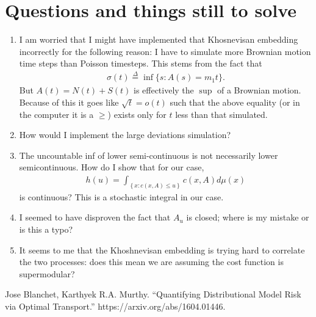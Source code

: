 \documentclass[12pt]{article}
\newcommand{\define}{\overset{\Delta}{=}}
\theoremstyle{definition}
\theoremstyle{definition}
\theoremstyle{definition}
\begin{document}
\section*{Questions and things still to solve}
\begin{enumerate}
\item I am worried that I might have implemented that Khosnevisan embedding incorrectly for the following reason: I have to simulate more Brownian motion time steps than Poisson timesteps. This stems from the fact that 
\begin{align*}
\sigma(t)\define\inf\{s: A(s)=m_1t\}.
\end{align*}
But $A(t)=N(t)+S(t)$ is effectively the $\sup$ of a Brownian motion. Because of this it goes like $\sqrt{t}=o(t)$ such that the above equality (or in the computer it is a $\geq$) exists only for $t$ less than that simulated.

\item How would I implement the large deviations simulation?

\item The uncountable inf of lower semi-continuous is not necessarily lower semicontinuous. How do I show that for our case,
\begin{align*}
h(u)=\int_{\left\{x:c(x,A)\leq u\right\}}^{}c(x,A)d\mu(x)
\end{align*}
is continuous? This is a stochastic integral in our case.
\item  I seemed to have disproven the fact that $A_u$ is closed; where is my mistake or is this a typo?
\item It seems to me that the Khoshnevisan embedding is trying hard to correlate the two processes: does this mean we are assuming the cost function is supermodular?

\end{enumerate}

\begin{thebibliography}{9}
 Jose Blanchet, Karthyek R.A. Murthy. ``Quantifying Distributional Model Risk via Optimal Transport.'' https://arxiv.org/abs/1604.01446.
\end{thebibliography}
\end{document}
